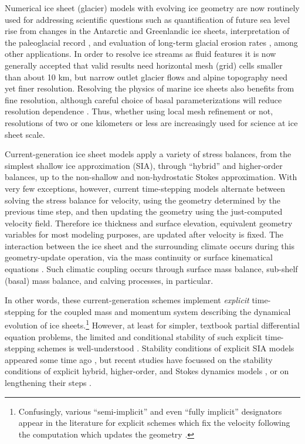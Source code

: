 \documentclass[review]{igs}
\begin{document}
Numerical ice sheet (glacier) models with evolving ice geometry are now routinely used for addressing scientific questions such as quantification of future sea level rise from changes in the Antarctic \citep{Seroussietal2020} and Greenlandic \citep{Goelzeretal2020} ice sheets, interpretation of the paleoglacial record \citep{Weberetal2021}, and evaluation of long-term glacial erosion rates \citep{SeguinotDelaney2021}, among other applications.  In order to resolve ice streams as fluid features it is now generally accepted that valid results need horizontal mesh (grid) cells smaller than about 10 km, but narrow outlet glacier flows and alpine topography need yet finer resolution.  Resolving the physics of marine ice sheets also benefits from fine resolution, although careful choice of basal parameterizations will reduce resolution dependence \citep{Gladstoneetal2017}.  Thus, whether using local mesh refinement \citep[for example]{Fischleretal2022,Hoffmanetal2018} or not, resolutions of two or one kilometers \citep{SeguinotDelaney2021} or less \citep{Aschwandenetal2019,Clarkeetal2015} are increasingly used for science at ice sheet scale.

Current-generation ice sheet models apply a variety of stress balances, from the simplest shallow ice approximation (SIA), through ``hybrid'' \citep{Robinsonetal2022,Winkelmannetal2011} and higher-order balances, up to the non-shallow and non-hydrostatic Stokes approximation.  With very few exceptions, however, current time-stepping models alternate between solving the stress balance for velocity, using the geometry determined by the previous time step, and then updating the geometry using the just-computed velocity field.  Therefore ice thickness and surface elevation, equivalent geometry variables for most modeling purposes, are updated after velocity is fixed.  The interaction between the ice sheet and the surrounding climate occurs during this geometry-update operation, via the mass continuity or surface kinematical equations \citep{GreveBlatter2009}.  Such climatic coupling occurs through surface mass balance, sub-shelf (basal) mass balance, and calving processes, in particular.

In other words, these current-generation schemes implement \emph{explicit} time-stepping for the coupled mass and momentum system describing the dynamical evolution of ice sheets.\footnote{Confusingly, various ``semi-implicit'' and even ``fully implicit'' designators appear in the literature for explicit schemes which fix the velocity following the computation which updates the geometry \citep[for example]{Chengetal2017}.}  However, at least for simpler, textbook partial differential equation problems, the limited and conditional stability of such explicit time-stepping schemes is well-understood \citep{LeVeque2007}.  Stability conditions of explicit SIA models appeared some time ago \citep[e.g.][]{HindmarshPayne1996}, but recent studies have focussed on the stability conditions of explicit hybrid, higher-order, and Stokes dynamics models \citep{Chengetal2017,Robinsonetal2022}, or on lengthening their steps \citep{LofgrenAhlkronaHelanow2022}.
\end{document}
